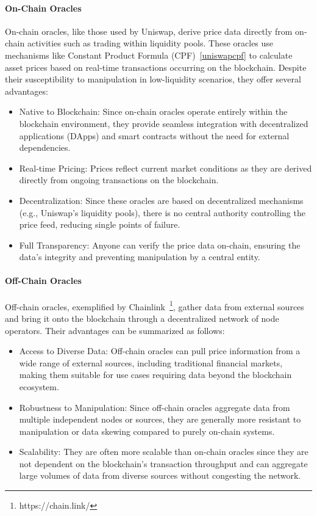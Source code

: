     \paragraph{On-Chain Oracles} On-chain oracles, like those used by Uniswap, derive price data directly from on-chain activities such as trading within liquidity pools. These oracles use mechanisms like Constant Product Formula (CPF)~\ref{uniswapcpf} to calculate asset prices based on real-time transactions occurring on the blockchain. Despite their susceptibility to manipulation in low-liquidity scenarios, they offer several advantages:
    \begin{itemize}
        \item Native to Blockchain: Since on-chain oracles operate entirely within the blockchain environment, they provide seamless integration with decentralized applications (DApps) and smart contracts without the need for external dependencies.
        \item Real-time Pricing: Prices reflect current market conditions as they are derived directly from ongoing transactions on the blockchain.
        \item Decentralization: Since these oracles are based on decentralized mechanisms (e.g., Uniswap’s liquidity pools), there is no central authority controlling the price feed, reducing single points of failure.
        \item Full Transparency: Anyone can verify the price data on-chain, ensuring the data's integrity and preventing manipulation by a central entity.
    \end{itemize}


    \paragraph{Off-Chain Oracles} Off-chain oracles, exemplified by Chainlink~\footnote{https://chain.link/}, gather data from external sources and bring it onto the blockchain through a decentralized network of node operators. Their advantages can be summarized as follows:
    
    \begin{itemize}
        \item Access to Diverse Data: Off-chain oracles can pull price information from a wide range of external sources, including traditional financial markets, making them suitable for use cases requiring data beyond the blockchain ecosystem.
        \item Robustness to Manipulation: Since off-chain oracles aggregate data from multiple independent nodes or sources, they are generally more resistant to manipulation or data skewing compared to purely on-chain systems.
        \item Scalability: They are often more scalable than on-chain oracles since they are not dependent on the blockchain’s transaction throughput and can aggregate large volumes of data from diverse sources without congesting the network.
    \end{itemize}
    
